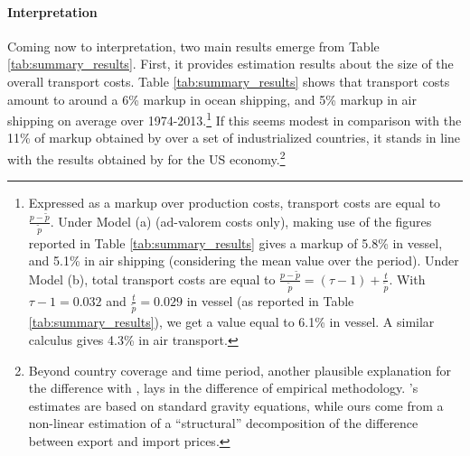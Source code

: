\documentclass[a4paper,11pt]{article}
\begin{document}
\paragraph{Interpretation} Coming now to interpretation, two main results emerge from Table \ref{tab:summary_results}.
First, it provides estimation results about the size of the overall transport costs.
Table \ref{tab:summary_results} shows that transport costs amount to around a 6\% markup in ocean shipping, and 5\% markup in air shipping on average over 1974-2013.\footnote{Expressed as a markup over production costs, transport costs are equal to $\frac{p-\widetilde{p}}{\widetilde{p}}$.
Under Model (a) (ad-valorem costs only), making use of the figures reported in Table \ref{tab:summary_results} gives a markup of 5.8\% in vessel, and 5.1\% in air shipping (considering the mean value over the period).
Under Model (b), total transport costs are equal to $\frac{p-\widetilde{p}}{\widetilde{p}} = (\tau-1) + \frac{t}{\widetilde{p}}$.
With $\tau-1= 0.032$ and $\frac{t}{\widetilde{p}}= 0.029$ in vessel (as reported in Table \ref{tab:summary_results}), we get a value equal to 6.1\% in vessel.
A similar calculus gives 4.3\% in air transport.} If this seems modest in comparison with the 11\% of markup obtained by \cite{anderson_wincoop_jel} over a set of industrialized countries, it stands in line with the results obtained by \cite{hummels2007} for the US economy.\footnote{Beyond country coverage and time period, another plausible explanation for the difference with \cite{anderson_wincoop_jel}, lays in the difference of empirical methodology.
\cite{anderson_wincoop_jel}'s estimates are based on standard gravity equations, while ours come from a non-linear estimation of a ``structural'' decomposition of the difference between export and import prices.}
\end{document}
